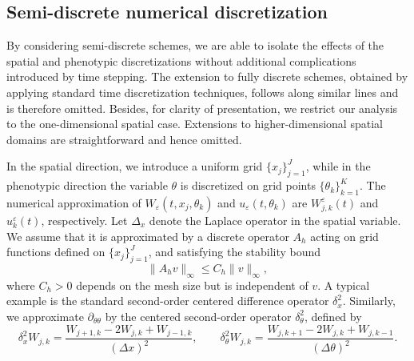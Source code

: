 \documentclass[11pt, dina4, amsfont12]{article}
\begin{document}

\subsection{Semi-discrete numerical discretization}
By considering semi-discrete schemes, we are able to isolate the effects of the
spatial and phenotypic discretizations without additional complications
introduced by time stepping. The extension to fully discrete schemes, obtained
by applying standard time discretization techniques, follows along similar
lines and is therefore omitted. 
Besides, for clarity of presentation, we restrict our
analysis to the one-dimensional spatial case. Extensions to higher-dimensional
spatial domains are straightforward and hence omitted.



In the spatial direction, we introduce a uniform grid
$\{x_j\}_{j=1}^J$, while in the phenotypic direction the variable $\theta$ is
discretized on grid points $\{\theta_k\}_{k=1}^K$.
The numerical approximation of $W_\varepsilon(t, x_j, \theta_k)$ and $u_{\varepsilon}(t, \theta_k)$ are 
$W_{j,k}^{\varepsilon}(t)$ and $u_k^{\varepsilon}(t)$, respectively. 
Let $\Delta_x$ denote the Laplace operator in the spatial variable.
We assume that it is approximated by a discrete operator $A_h$ acting on grid
functions defined on $\{x_j\}_{j=1}^J$, and satisfying the stability bound
\[
\|A_h v\|_\infty \le C_h \|v\|_\infty,
\]
where $C_h>0$ depends on the mesh size but is independent of $v$.
A typical example is the standard second-order centered difference operator
$\delta_x^2$.
Similarly, we approximate $\partial_{\theta\theta}$ by the centered
second-order operator $\delta_\theta^2$, defined by
\[
\delta_x^2 W_{j,k}
=
\frac{W_{j+1,k}-2W_{j,k}+W_{j-1,k}}{(\Delta x)^2},
\qquad
\delta_\theta^2 W_{j,k}
=
\frac{W_{j,k+1}-2W_{j,k}+W_{j,k-1}}{(\Delta\theta)^2}.
\]
\end{document}
